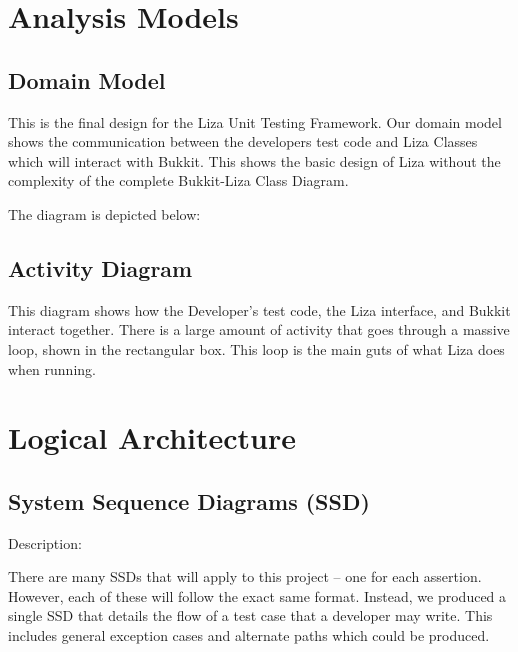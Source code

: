 \documentclass{article}
\begin{document}
\section{Analysis Models}
\subsection{Domain Model}

This is the final design for the Liza Unit Testing Framework.  Our domain model shows the 
communication between the developers test code and Liza Classes which will interact
with Bukkit.  This shows the basic design of Liza without the complexity of the complete
Bukkit-Liza Class Diagram. \newline \newline

\noindent The diagram is depicted below:



\newpage

\subsection{Activity Diagram}

\noindent   This diagram shows how the Developer's test code, the Liza interface, and Bukkit interact together.
There is a large amount of activity that goes through a massive loop, shown in the rectangular box.  This loop
is the main guts of what Liza does when running.



\newpage

\section{Logical Architecture}
\subsection{System Sequence Diagrams (SSD)}

Description:  \newline

There are many SSDs that will apply to this project -- one for each assertion. 
However, each of these will follow the exact same format. Instead, we
produced a single SSD that details the flow of a test case that a developer may
write.  This includes general exception cases and alternate paths which could be
produced.  \newline \newline
\end{document}
